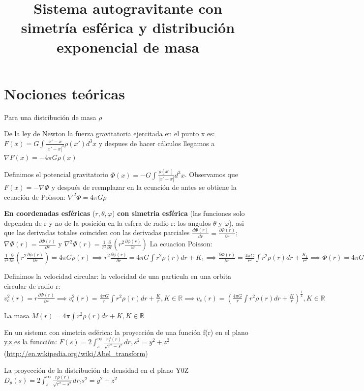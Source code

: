 \documentclass[12pt]{book}
\title{Sistema autogravitante con simetría esférica y distribución exponencial de masa}
\date{}
\begin{document}
\section*{Nociones teóricas}

Para una distribución de masa $\rho$

\begin{description}
\item De la ley de Newton la fuerza gravitatoria ejercitada en el punto x es:  $F(x) = G \int{\frac{x\prime - x}{|x\prime - x|^3}\rho(x\prime)d^3x} $ y despues de hacer cálculos llegamos a $ \nabla F(x) = -4\pi G \rho(x) $
\item Definimos el potencial gravitatorio $\Phi(x) = -G \int{\frac{\rho(x\prime)}{|x\prime - x|}d^3x} $. Observamos que $F(x) = - \nabla \Phi $ y después de reemplazar en la ecuación de antes se obtiene la ecuación de Poisson: $\nabla^2 \Phi = 4\pi G \rho $
\item \textbf{En coordenadas esféricas} ($r,\theta,\varphi$) \textbf{con simetria esférica} 
(las funciones solo dependen de r y no de la posición en la esfera de radio r: los angulos $\theta$ y $\varphi$), asi que las derivadas totales coinciden con las derivadas parciales $\frac {d\Phi(r)}{dr} = \frac{\partial \Phi(r)}{\partial r} $; 
$\nabla \Phi(r) = \frac{\partial \Phi(r)}{\partial r} $ y 
$\nabla^2 \Phi(r) = \frac{1}{r^2} \frac{\partial }{\partial r}(r^2 \frac{\partial \phi(r)}{\partial r})$
La ecuacion Poisson:$ \frac{1}{r^2} \frac{\partial }{\partial r}(r^2 \frac{\partial \phi(r)}{\partial r}) = 4\pi G \rho(r) \implies
r^2 \frac{\partial \phi(r)}{\partial r} = 4\pi G \int{r^2\rho(r)dr} + K_1 \implies
\frac{\partial \Phi(r)}{\partial r} = \frac{4 \pi G}{r^2}\int{r^2\rho(r)dr} + \frac{K_1}{r^2}\implies
\Phi(r) = 4\pi G \int{\frac{1}{r^2}(\int{r^2\rho(r)dr})dr } + K_1\int{\frac{1}{r^2}dr} + K_2
=4\pi G \int{\frac{1}{r^2}(\int{r^2\rho(r)dr})dr } + \frac{K_1}{r} + K_2, K_1, K_2 \in \mathbb{R} (el signo - con K_1)
 $
\item Definimos la velocidad circular: la velocidad de una particula en una orbita circular de radio r:
$v_c^2(r) = r\frac{\partial \Phi(r)}{\partial r} \implies
v_c^2(r) = \frac{4\pi G}{r}\int{r^2\rho(r)dr} + \frac{K}{r}, K \in \mathbb{R} \implies 
v_c(r) = (\frac{4 \pi G}{r}\int{r^2\rho(r)dr} + \frac{K}{r})^{\frac{1}{2}}, K \in \mathbb{R}
$
\item La masa $M(r) = 4 \pi \int{r^2\rho(r)dr} + K, K \in \mathbb{R}$
\item En un sistema con simetria esférica: la proyección de una función f(r) en el plano y,z es la funcción: 
$F(s) = 2\int_s^\infty{\frac{r f(r)}{\sqrt{r^2-s^2}}dr}, s^2=y^2 + z^2$ (\url{http://en.wikipedia.org/wiki/Abel\_transform})
\item La proyección de la distribución de densidad en el plano Y0Z $D_p(s) =  2\int_s^\infty{\frac{r \rho(r)}{\sqrt{r^2-s^2}}dr}$,$s^2 = y^2 + z^2$ 

\end{description}
\end{document}

